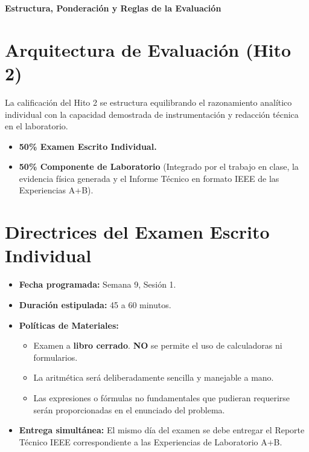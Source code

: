 \documentclass[11pt, a4paper]{article}
\begin{document}
\begin{tcolorbox}[colback=ucbblue!5!white, colframe=ucbblue, title=\textbf{Briefing Oficial de Evaluación: Hito 2 (Unidad EC2)}]
    \centering \textbf{Estructura, Ponderación y Reglas de la Evaluación}
\end{tcolorbox}

\section*{Arquitectura de Evaluación (Hito 2)}
La calificación del Hito 2 se estructura equilibrando el razonamiento analítico individual con la capacidad demostrada de instrumentación y redacción técnica en el laboratorio.

\begin{itemize}
    \item \textbf{50\% Examen Escrito Individual.}
    \item \textbf{50\% Componente de Laboratorio} (Integrado por el trabajo en clase, la evidencia física generada y el Informe Técnico en formato IEEE de las Experiencias A+B).
\end{itemize}

\section*{Directrices del Examen Escrito Individual}
\begin{itemize}\setlength\itemsep{0.2em}
    \item \textbf{Fecha programada:} Semana 9, Sesión 1.
    \item \textbf{Duración estipulada:} 45 a 60 minutos.
    \item \textbf{Políticas de Materiales:} 
    \begin{itemize}
        \item Examen a \textbf{libro cerrado}. \textbf{NO} se permite el uso de calculadoras ni formularios.
        \item La aritmética será deliberadamente sencilla y manejable a mano.
        \item Las expresiones o fórmulas no fundamentales que pudieran requerirse serán proporcionadas en el enunciado del problema.
    \end{itemize}
    \item \textbf{Entrega simultánea:} El mismo día del examen se debe entregar el Reporte Técnico IEEE correspondiente a las Experiencias de Laboratorio A+B.
\end{itemize}
\end{document}
